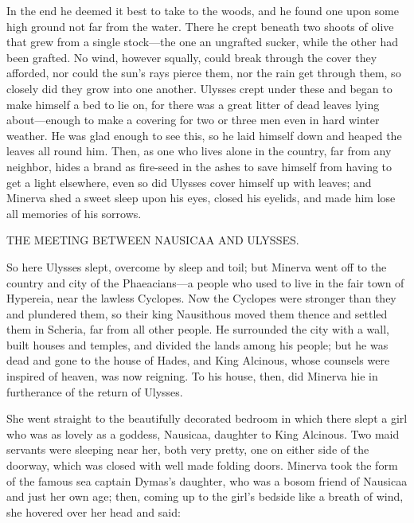 In the end he deemed it best to take to the woods, and he found one upon some
high ground not far from the water. There he crept beneath two shoots of olive
that grew from a single stock—the one an ungrafted sucker, while the other had
been grafted. No wind, however squally, could break through the cover they
afforded, nor could the sun’s rays pierce them, nor the rain get through them,
so closely did they grow into one another. Ulysses crept under these and began
to make himself a bed to lie on, for there was a great litter of dead leaves
lying about—enough to make a covering for two or three men even in hard winter
weather. He was glad enough to see this, so he laid himself down and heaped the
leaves all round him. Then, as one who lives alone in the country, far from any
neighbor, hides a brand as fire-seed in the ashes to save himself from having
to get a light elsewhere, even so did Ulysses cover himself up with leaves; and
Minerva shed a sweet sleep upon his eyes, closed his eyelids, and made him lose
all memories of his sorrows.


THE MEETING BETWEEN NAUSICAA AND ULYSSES.

So here Ulysses slept, overcome by sleep and toil; but Minerva went off to the
country and city of the Phaeacians—a people who used to live in the fair town
of Hypereia, near the lawless Cyclopes. Now the Cyclopes were stronger than
they and plundered them, so their king Nausithous moved them thence and settled
them in Scheria, far from all other people. He surrounded the city with a wall,
built houses and temples, and divided the lands among his people; but he was
dead and gone to the house of Hades, and King Alcinous, whose counsels were
inspired of heaven, was now reigning. To his house, then, did Minerva hie in
furtherance of the return of Ulysses.

She went straight to the beautifully decorated bedroom in which there slept a
girl who was as lovely as a goddess, Nausicaa, daughter to King Alcinous. Two
maid servants were sleeping near her, both very pretty, one on either side of
the doorway, which was closed with well made folding doors. Minerva took the
form of the famous sea captain Dymas’s daughter, who was a bosom friend of
Nausicaa and just her own age; then, coming up to the girl’s bedside like a
breath of wind, she hovered over her head and said:


